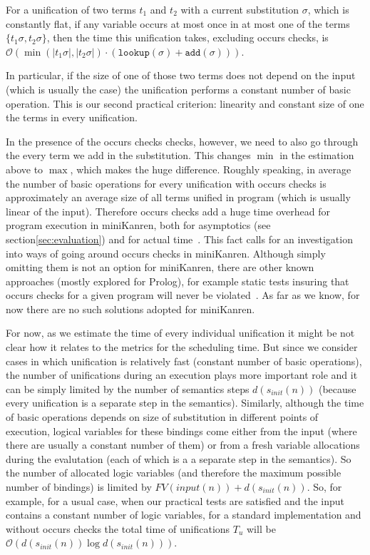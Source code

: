 \documentclass[acmsmall, anonymous, review]{acmart}
\newcommand{\sectionword}{section}
\newcommand{\mK}{miniKanren\xspace}
\newcommand{\lookuptime}[1]{\texttt{lookup}(#1)}
\newcommand{\addtime}[1]{\texttt{add}(#1)}
\renewcommand{\O}{\mathcal{O}}
\begin{document}
\begin{lemma}
For a unification of two terms $t_1$ and $t_2$ with a current substitution $\sigma$, which is constantly flat, if any variable occurs at most once in at most one of the terms $\{ t_1 \sigma, t_2 \sigma \}$, then the time this unification takes, excluding occurs checks, is $\O(\min(|t_1 \sigma|, |t_2 \sigma|) \cdot (\lookuptime{\sigma} + \addtime{\sigma}))$.
\end{lemma}

In particular, if the size of one of those two terms does not depend on the input (which is usually the case) the unification performs a constant number of basic operation. This is our second practical criterion: linearity and constant size of one the terms in every unification.

In the presence of the occurs checks checks, however, we need to also go through the every term we add in the substitution. This changes $\min$ in the estimation above to $\max$, which makes the huge difference. Roughly speaking, in average the number of basic operations for every unification with occurs checks is approximately an average size of all terms unified in program (which is usually linear of the input). Therefore occurs checks add a huge time overhead for program execution in \mK, both for asymptotics (see \sectionword\~\ref{sec:evaluation}) and for actual time~\cite{WillThesis}. This fact calls for an investigation into ways of going around occurs checks in \mK. Although simply omitting them is not an option for \mK, there are other known approaches (mostly explored for Prolog), for example static tests insuring that occurs checks for a given program will never be violated~\cite{OccursCheckStaticTest}. As far as we know, for now there are no such solutions adopted for \mK.

For now, as we estimate the time of every individual unification it might be not clear how it relates to the metrics for the scheduling time. But since we consider cases in which unification is relatively fast (constant number of basic operations), the number of unifications during an execution plays more important role and it can be simply limited by the number of semantics steps $d(s_{init}(n))$ (because every unification is a separate step in the semantics). Similarly, although the time of basic operations depends on size of substitution in different points of execution, logical variables for these bindings come either from the input (where there are usually a constant number of them) or from a fresh variable allocations during the evalutation (each of which is a a separate step in the semantics). So the number of allocated logic variables (and therefore the maximum possible number of bindings) is limited by $FV(input(n)) + d(s_{init}(n))$. So, for example, for a usual case, when our practical tests are satisfied and the input contains a constant number of logic variables, for a standard implementation and without occurs checks the total time of unifications $T_u$ will be $\O(d(s_{init}(n)) \log d(s_{init}(n)))$.
\end{document}
